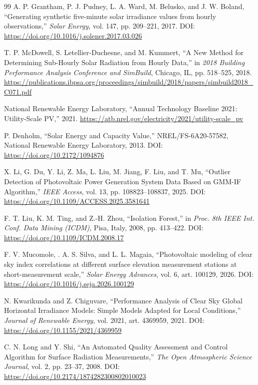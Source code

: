 \documentclass[12pt,a4paper]{article}
\begin{document}
\begin{thebibliography}{99}
A. P. Grantham, P. J. Pudney, L. A. Ward, M. Belusko, and J. W. Boland,
``Generating synthetic five-minute solar irradiance values from hourly observations,''
\textit{Solar Energy}, vol. 147, pp. 209--221, 2017.
DOI: \url{https://doi.org/10.1016/j.solener.2017.03.026}

T. P. McDowell, S. Letellier-Duchesne, and M. Kummert,
``A New Method for Determining Sub-Hourly Solar Radiation from Hourly Data,''
in \textit{2018 Building Performance Analysis Conference and SimBuild}, Chicago, IL, pp. 518--525, 2018.
\url{https://publications.ibpsa.org/proceedings/simbuild/2018/papers/simbuild2018_C071.pdf}

National Renewable Energy Laboratory,
``Annual Technology Baseline 2021: Utility-Scale PV,'' 2021.
\url{https://atb.nrel.gov/electricity/2021/utility-scale_pv}

P. Denholm,
``Solar Energy and Capacity Value,'' NREL/FS-6A20-57582, National Renewable Energy Laboratory, 2013.
DOI: \url{https://doi.org/10.2172/1094876}


X. Li, G. Du, Y. Li, Z. Ma, L. Liu, M. Jiang, F. Liu, and T. Mu,
``Outlier Detection of Photovoltaic Power Generation System Data Based on GMM-IF Algorithm,''
\textit{IEEE Access}, vol. 13, pp. 108823--108837, 2025.
DOI: \url{https://doi.org/10.1109/ACCESS.2025.3581641}

F. T. Liu, K. M. Ting, and Z.-H. Zhou,
``Isolation Forest,''
in \textit{Proc. 8th IEEE Int. Conf. Data Mining (ICDM)}, Pisa, Italy, 2008, pp. 413--422.
DOI: \url{https://doi.org/10.1109/ICDM.2008.17}

F. V. Mucomole, . A. S. Silva, and L. L. Magaia,
``Photovoltaic modeling of clear sky index correlations at different surface elevation measurement stations at short-measurement scale,''
\textit{Solar Energy Advances}, vol. 6, art. 100129, 2026.
DOI: \url{https://doi.org/10.1016/j.seja.2026.100129}

N. Kwarikunda and Z. Chiguvare,
``Performance Analysis of Clear Sky Global Horizontal Irradiance Models: Simple Models Adapted for Local Conditions,''
\textit{Journal of Renewable Energy}, vol. 2021, art. 4369959, 2021.
DOI: \url{https://doi.org/10.1155/2021/4369959}

C. N. Long and Y. Shi,
``An Automated Quality Assessment and Control Algorithm for Surface Radiation Measurements,''
\textit{The Open Atmospheric Science Journal}, vol. 2, pp. 23--37, 2008.
DOI: \url{https://doi.org/10.2174/1874282300802010023}


\end{thebibliography}
\end{document}
